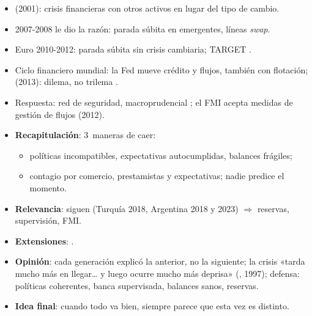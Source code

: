 \documentclass{article}
\begin{document}
\begin{columnas}
\begin{itemize}
\item {} (2001): crisis financieras con otros activos en lugar del tipo de cambio.
\item 2007-2008 le dio la razón: parada súbita en emergentes, líneas \emph{swap}.
\item Euro 2010-2012: parada súbita sin crisis cambiaria; TARGET .
\item Ciclo financiero mundial: la Fed mueve crédito y flujos, también con flotación;  (2013): dilema, no trilema .
\item Respuesta: red de seguridad, macroprudencial ; el FMI acepta medidas de gestión de flujos (2012).
\end{itemize}

\begin{itemize}
\item \textbf{Recapitulación}: 3~maneras de caer:
  \begin{itemize}
  \item políticas incompatibles, expectativas autocumplidas, balances frágiles;
  \item contagio por comercio, prestamistas y expectativas; nadie predice el momento.
  \end{itemize}
\item \textbf{Relevancia}: siguen (Turquía 2018, Argentina 2018 y 2023) $\Rightarrow$ reservas, supervisión, FMI.
\item \textbf{Extensiones}:      .
\item \textbf{Opinión}: cada generación explicó la anterior, no la siguiente; la crisis «tarda mucho más en llegar\ldots{} y luego ocurre mucho más deprisa» (, 1997); defensa: políticas coherentes, banca supervisada, balances sanos, reservas.
\item \textbf{Idea final}: cuando todo va bien, siempre parece que esta vez es distinto.
\end{itemize}


\end{columnas}
\end{document}
